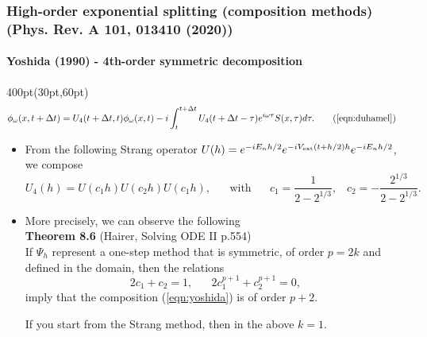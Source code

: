 \begin{frame}
\frametitle{High-order exponential splitting (composition methods)
        (Phys. Rev. A 101, 013410 (2020))}
	\framesubtitle{Yoshida (1990) - 4th-order symmetric decomposition}
\footnotesize
\begin{textblock*}{400pt}(30pt,60pt)
\begin{align}
	\phi_\omega(x,t+\Delta t) & = U_4( t+\Delta t,t )\phi_\omega(x,t)
	  -i\int_{t}^{t+\Delta t} 
	    U_4(t+\Delta t-\tau)  e^{i\omega\tau} S(x,\tau)d\tau. \tag{\ref{eqn:duhamel}}
\end{align}
\begin{itemize}
\item From the following Strang operator 
	$U(h) = e^{-iE_n h/2}e^{-iV_{\rm ext}(t+h/2)h}e^{-iE_n h/2}$,
we compose 
	\begin{equation}
		U_4(h) =  U(c_1h)  U(c_2h)  U(c_1h), 
		\hspace{20pt}
		\mbox{with}
		\hspace{20pt}
		c_1 = \frac{1}{2-2^{1/3}}, \hspace{10pt}
		c_2 = -\frac{2^{1/3}}{2-2^{1/3}}.  \label{eqn:yoshida}
	\end{equation}
\item More precisely, we can observe the following \\\vspace{10pt}
	\textbf{Theorem 8.6} (Hairer, Solving ODE II p.554) \\
	If $\Psi_h$ represent a one-step method that is symmetric,
		of order $p=2k$ and defined 
		in the domain, then the relations
		\begin{equation}
			2c_1 + c_2 = 1, \hspace{20pt}
			2c_1^{p+1} + c_2^{p+1} = 0,
		\end{equation}
		imply that the composition (\ref{eqn:yoshida}) is of order $p+2$.\\
		\vspace{10pt}
		
		If you start from the Strang method,
		then in the above $k=1$.
	
\end{itemize}

\end{textblock*}

\end{frame}



